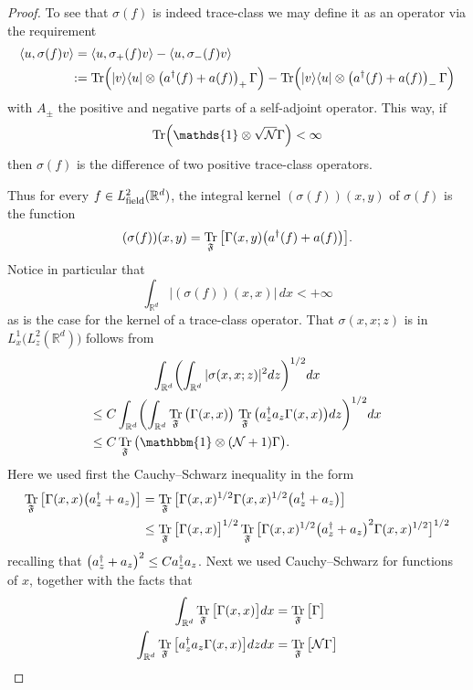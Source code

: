 \documentclass[AHL,Unicode,longabstracts,published]{cedram}
\DeclareMathOperator{\Tr}{Tr}
\DeclareMathOperator{\field}{field}
\newcommand{\R}{\mathbb{R}}
\newcommand{\cN}{\mathcal{N}}
\newcommand{\gF}{\mathfrak{F}}
\newcommand{\1}{\mathds{1}}
\let\oldin\in
\renewcommand{\in}{\mathchoice{\oldin}{\oldin}{\,\oldin\,}{\,\oldin\,}}
\let\originalleft\left
\let\originalright\right
\renewcommand{\left}{\mathopen{}\mathclose\bgroup\originalleft}
\renewcommand{\right}{\aftergroup\egroup\originalright}
\newcommand*{\Mk}{\mkern -2mu}
\newcommand*{\MK}{\mkern 2mu}
\begin{document}
\begin{proof}
To see that $\sigma(f)$ is indeed trace-class we may define it as an operator via the requirement
\begin{align*}
\left\langle u, \sigma (f) v \right\rangle &= \left\langle u, \sigma_+ (f) v \right\rangle - \left\langle u, \sigma_- (f) v \right\rangle\\
\,\MK &\!\Mk:= \Tr\left(|v \rangle \langle u| \otimes \left(a^\dagger(f) + a (f) \right)_+ \,\Gamma\right) - \Tr\left(|v \rangle \langle u| \otimes \left(a^\dagger(f) + a (f) \right)_- \,\Gamma\right)
\end{align*}
with $A_\pm$ the positive and negative parts of a self-adjoint operator. This way, if
\begin{equation*}
\Tr \left(\1 \otimes \sqrt{\cN} \Gamma \right) < \infty
\end{equation*}
then $ \sigma (f)$ is the difference of two positive trace-class operators.


Thus for every $f\in L^2_{\field}(\R^d)$, the integral kernel $(\sigma(f))(x,y)$ of $\sigma(f)$ is the function
\begin{equation*}
\left(\sigma(f)\right)(x,y)=\Tr_{\gF}\big[\Gamma(x,y)\left(a^\dagger(f) + a (f) \right) \big].
\end{equation*}
Notice in particular that
\begin{equation*}
\int_{\R^d} |(\sigma(f))(x,x)|\,dx <+\infty
\end{equation*}
as is the case for the kernel of a trace-class operator. That $\sigma(x,x;z)$ is in $L^1_x\big(L^2_z(\R^d)\big)$ follows from
\begin{multline}\label{eq:summability_sigma}
\int_{\R^d}\left(\int_{\R^d}|\sigma(x,x;z)|^2dz\right)^{1/2}dx\\
\begin{aligned}
\le\;& C \int_{\R^d}\left(\int_{\R^d} \Tr_{\gF}\big(\Gamma(x,x)\big)\,\Tr_{\gF} \big(a^\dagger_z a_z \Gamma(x,x)\big)dz\right)^{1/2}dx\\
\le\;& C \Tr_{\gF}\big(\mathbbm{1}\otimes(\cN+1) \Gamma\big).
\end{aligned}
\end{multline}
Here we used first the Cauchy--Schwarz inequality in the form
\begin{align*}
\Tr_{\gF}\big[\Gamma(x,x) \left(a^\dagger_z + a_z \right)\big] &= \Tr_{\gF}\big[\Gamma(x,x)^{1/2} \Gamma(x,x)^{1/2} \left(a^\dagger_z + a_z \right)\big]\\
&\leq \Tr_{\gF}\big[\Gamma(x,x)\big] ^{1/2} \Tr_{\gF}\big[\Gamma(x,x)^{1/2} \left(a^\dagger_z + a_z \right)^2 \Gamma(x,x)^{1/2}\big] ^{1/2}
\end{align*}
recalling that $\left(a^\dagger_z + a_z \right)^2 \leq C a_z^\dagger a_z$. Next we used Cauchy--Schwarz for functions of $x$, together with the facts that
\begin{align*}
\int_{\R^d} \Tr_{\gF}\big[\Gamma(x,x) \big]dx &= \Tr_{\gF}\big[\Gamma \big]\\
\int_{\R^d} \Tr_{\gF}\big[a_z^\dagger a_z \Gamma(x,x) \big]dz dx &= \Tr_{\gF}\big[\cN \Gamma \big]\qedhere
\end{align*}
\end{proof}
\end{document}
